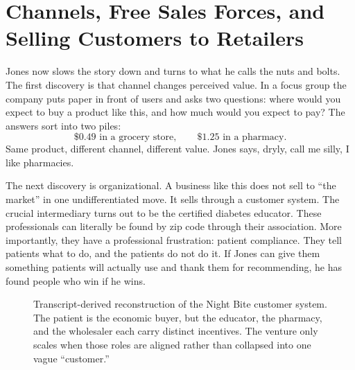\section{Channels, Free Sales Forces, and Selling Customers to Retailers}

Jones now slows the story down and turns to what he calls the nuts and bolts. The first discovery is that channel changes perceived value. In a focus group the company puts paper in front of users and asks two questions: where would you expect to buy a product like this, and how much would you expect to pay? The answers sort into two piles:
\begin{equation}
\$0.49 \text{ in a grocery store},
\qquad
\$1.25 \text{ in a pharmacy.}
\end{equation}
Same product, different channel, different value. Jones says, dryly, call me silly, I like pharmacies.

The next discovery is organizational. A business like this does not sell to ``the market'' in one undifferentiated move. It sells through a customer system. The crucial intermediary turns out to be the certified diabetes educator. These professionals can literally be found by zip code through their association. More importantly, they have a professional frustration: patient compliance. They tell patients what to do, and the patients do not do it. If Jones can give them something patients will actually use and thank them for recommending, he has found people who win if he wins.

\begin{figure}
\centering
{}
\caption{Transcript-derived reconstruction of the Night Bite customer system. The patient is the economic buyer, but the educator, the pharmacy, and the wholesaler each carry distinct incentives. The venture only scales when those roles are aligned rather than collapsed into one vague ``customer.''}
\end{figure}


